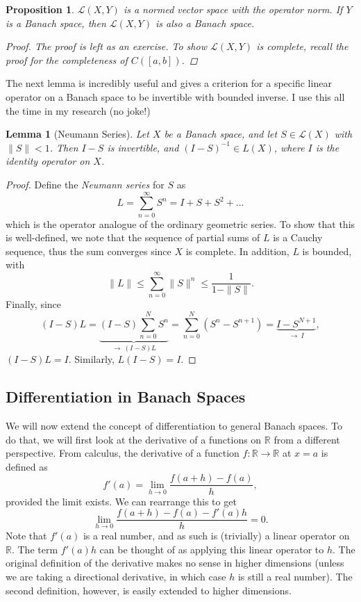 \documentclass[12pt]{amsart}         %
\newtheorem{proposition}{Proposition}[section]
\newtheorem{lemma}{Lemma}[section]
\theoremstyle{remark}
\newcommand{\R}{\mathbb{R}}
\begin{document}
\begin{proposition}
$\mathcal{L}(X, Y)$ is a normed vector space with the operator norm. If $Y$ is a Banach space, then $\mathcal{L}(X, Y)$ is also a Banach space.
\begin{proof}
The proof is left as an exercise. To show $\mathcal{L}(X, Y)$ is complete, recall the proof for the completeness of $C([a,b])$.
\end{proof}
\end{proposition}

The next lemma is incredibly useful and gives a criterion for a specific linear operator on a Banach space to be invertible with bounded inverse. I use this all the time in my research (no joke!)

\begin{lemma}[Neumann Series]
Let $X$ be a Banach space, and let $S \in \mathcal{L}(X)$ with $\|S\| < 1$. Then $I - S$ is invertible, and $(I - S)^{-1} \in L(X)$, where $I$ is the identity operator on $X$.
\end{lemma}

\begin{proof}
Define the \emph{Neumann series} for $S$ as 
\[
L = \sum_{n=0}^{\infty} S^n = I + S + S^2 + ... 
\]
which is the operator analogue of the ordinary geometric series. To show that this is well-defined, we note that the sequence of partial sums of $L$ is a Cauchy sequence, thus the sum converges since $X$ is complete. In addition, $L$ is bounded,
with
\[
\|L\| \leq \sum_{n=0}^\infty \|S\|^n \leq \frac{1}{1 - \|S\|}.
\]
Finally, since
\[(I - S)L = \underbrace{(I - S) \sum_{n=0}^{N} S^n}_{\rightarrow \: (I-S)L} = \sum_{n=0}^N (S^n - S^{n+1}) = 
\underbrace{I - S^{N+1}}_{\rightarrow \: I},
\]
$(I-S)L = I$. Similarly, $L(I - S) = I$.
\end{proof}

\subsection{Differentiation in Banach Spaces}

We will now extend the concept of differentiation to general Banach spaces. To do that, we will first look at the derivative of a functions on $\R$ from a different perspective. From calculus, the derivative of a function $f: \R \rightarrow \R$ at $x = a$ is defined as 
\[
f'(a) = \lim_{h \rightarrow 0}\frac{f(a + h) - f(a)}{h},
\]
provided the limit exists. We can rearrange this to get
\[
\lim_{h \rightarrow 0}\frac{f(a + h) - f(a) - f'(a) h }{h} = 0.
\]
Note that $f'(a)$ is a real number, and as such is (trivially) a linear operator on $\R$. The term $f'(a) h$ can be thought of as applying this linear operator to $h$. The original definition of the derivative makes no sense in higher dimensions (unless we are taking a directional derivative, in which case $h$ is still a real number). The second definition, however, is easily extended to higher dimensions.
\end{document}
